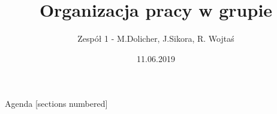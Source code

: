 \documentclass[12pt]{beamer}
\title{Organizacja pracy w grupie}
\date{11.06.2019}
\author{Zespół 1 - M.Dolicher, J.Sikora, R. Wojtaś}
\institute{Projektowanie układów sterowania (projekt grupowy) - edycja 19L}
\begin{document}
\maketitle

\begin{frame}{Agenda}
  [sections numbered]
  \tableofcontents[hideallsubsections]
\end{frame}





\end{document}
